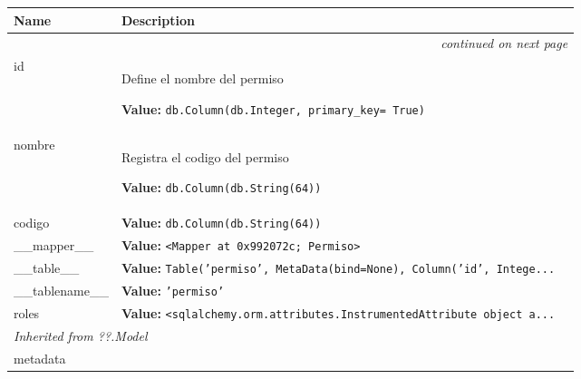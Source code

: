     \vspace{-1cm}
\hspace{\varindent}\begin{longtable}{|p{\varnamewidth}|p{\vardescrwidth}|l}
\cline{1-2}
\cline{1-2} \centering \textbf{Name} & \centering \textbf{Description}& \\
\cline{1-2}
\endhead\cline{1-2}\multicolumn{3}{r}{\small\textit{continued on next page}}\\\endfoot\cline{1-2}
\endlastfoot\raggedright i\-d\- & \raggedright Define el nombre del permiso

\textbf{Value:} 
{\tt db.Column(db.Integer, primary\_key= True)}&\\
\cline{1-2}
\raggedright n\-o\-m\-b\-r\-e\- & \raggedright Registra el codigo del permiso

\textbf{Value:} 
{\tt db.Column(db.String(64))}&\\
\cline{1-2}
\raggedright c\-o\-d\-i\-g\-o\- & \raggedright \textbf{Value:} 
{\tt db.Column(db.String(64))}&\\
\cline{1-2}
\raggedright \_\-\_\-m\-a\-p\-p\-e\-r\-\_\-\_\- & \raggedright \textbf{Value:} 
{\tt {\textless}Mapper at 0x992072c; Permiso{\textgreater}}&\\
\cline{1-2}
\raggedright \_\-\_\-t\-a\-b\-l\-e\-\_\-\_\- & \raggedright \textbf{Value:} 
{\tt Table('permiso', MetaData(bind=None), Column('id', Intege\texttt{...}}&\\
\cline{1-2}
\raggedright \_\-\_\-t\-a\-b\-l\-e\-n\-a\-m\-e\-\_\-\_\- & \raggedright \textbf{Value:} 
{\tt \texttt{'}\texttt{permiso}\texttt{'}}&\\
\cline{1-2}
\raggedright r\-o\-l\-e\-s\- & \raggedright \textbf{Value:} 
{\tt {\textless}sqlalchemy.orm.attributes.InstrumentedAttribute object a\texttt{...}}&\\
\cline{1-2}
\multicolumn{2}{|l|}{\textit{Inherited from ??.Model}}\\
\multicolumn{2}{|p{\varwidth}|}{\raggedright metadata}\\
\cline{1-2}
\end{longtable}

